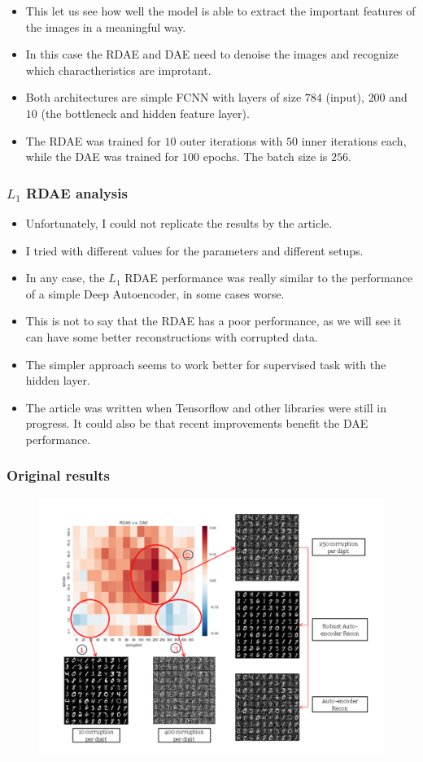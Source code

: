 \documentclass{beamer}
\theoremstyle{plain}
\theoremstyle{definition}
\theoremstyle{remark}
\begin{document}
\begin{frame}
	\begin{itemize}
		\item This let us see how well the model is able to extract the important features of the images in a meaningful way.
		\item In this case the RDAE and DAE need to denoise the images and recognize which charactheristics are improtant.
		\item Both architectures are simple FCNN with layers of size $784$ (input), $200$ and $10$ (the bottleneck and hidden feature layer).
		\item The RDAE was trained for $10$ outer iterations with $50$ inner iterations each, while the DAE was trained for $100$ epochs. The batch size is $256$.
	\end{itemize}
\end{frame}

\begin{frame}
	\frametitle{$L_1$ RDAE analysis}
	\begin{itemize}
		\item Unfortunately, I could not replicate the results by the article.
		\item I tried with different values for the parameters and different setups.
		\item In any case, the $L_1$ RDAE performance was really similar to the performance of a simple Deep Autoencoder, in some cases worse.
		\item This is not to say that the RDAE has a poor performance, as we will see it can have some better reconstructions with corrupted data.
		\item The simpler approach seems to work better for supervised task with the hidden layer.
		\item The article was written when Tensorflow and other libraries were still in progress. It could also be that recent improvements benefit the DAE performance.
	\end{itemize}
\end{frame}

\begin{frame}
	\frametitle{Original results}
	\begin{figure}
		\centering
		\includegraphics[width=0.8\linewidth]{Images/original_l1.png}
	\end{figure}
\end{frame}
\end{document}

